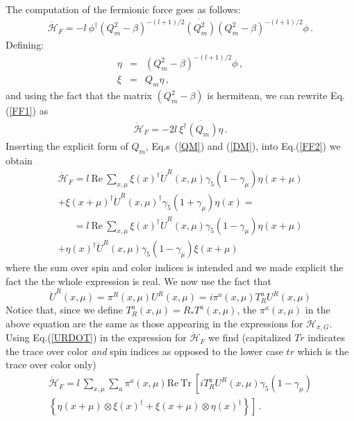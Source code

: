 \documentclass{article}[12pt]
\begin{document}
The computation of the fermionic force goes as follows:
\begin{eqnarray}
\dot{\mathcal{H}}_F = -l\ \phi^\dagger (Q_m^2 - \beta)^{-(l+1)/2} \dot{(Q_m^2)} (Q_m^2 - \beta)^{-(l+1)/2} \phi \, . \label{FF1}
\end{eqnarray}
Defining:
\begin{eqnarray}
\eta &=& (Q_m^2 - \beta)^{-(l+1)/2} \phi \, , \label{HMCETA}\\
\xi &=& Q_m \eta \, ,
\end{eqnarray}
and using the fact that the matrix $(Q_m^2-\beta)$ is hermitean, we can rewrite Eq.(\ref{FF1}) as
\begin{eqnarray}
\dot{\mathcal{H}}_F = - 2 l\ \xi^\dagger \dot{(Q_m)} \eta \, . \label{FF2}
\end{eqnarray}
Inserting the explicit form of $Q_m$, Eq.s~(\ref{QM}) and (\ref{DM}), into Eq.(\ref{FF2}) we obtain
\begin{multline}
\dot{\mathcal{H}}_F = l\ \mathrm{Re\ }\sum_{x,\mu} \xi(x)^\dagger \dot U^R(x,\mu) \gamma_5 (1-\gamma_\mu) \eta(x+\mu) \\ 
+ \xi(x+\mu)^\dagger \dot U^R(x,\mu)^\dagger \gamma_5 (1+\gamma_\mu) \eta(x) = \nonumber 
\end{multline}
\begin{multline}
\phantom{\dot{\mathcal{H}}_F} =  l\ \mathrm{Re\ }\sum_{x,\mu} \xi(x)^\dagger \dot U^R(x,\mu) \gamma_5 (1-\gamma_\mu) \eta(x+\mu) \\ 
+ \eta(x)^\dagger \dot U^R(x,\mu) \gamma_5 (1-\gamma_\mu) \xi(x+\mu)
\end{multline}
where the sum over spin and color indices is intended and we made explicit the fact the the whole 
expression is real.
We now use the fact that 
\begin{equation}
\dot U^R (x,\mu) = \pi^R(x,\mu) U^R(x,\mu) = i \pi^a(x,\mu) T^a_R U^R(x,\mu) \label{URDOT}
\end{equation}
Notice that, since we define $T^a_R(x,\mu) = R_* T^a(x,\mu)$, the $\pi^a(x,\mu)$ in the above 
equation are the same as those appearing in the expressions for $\dot{\mathcal{H}}_{\pi,G}$.
Using Eq.(\ref{URDOT}) in the expression for $\dot{\mathcal{H}}_{F}$ we find
(capitalized $Tr$ indicates the trace over color \textit{and} spin indices as opposed to the lower
 case $tr$ which is the trace over color only)
\begin{multline}
\dot{\mathcal{H}}_F = l\ \sum_{x,\mu} \sum_a \pi^a(x,\mu) \mathrm{Re\ Tr\ } \left[ iT^a_R U^R(x,\mu) \gamma_5 (1-\gamma_\mu) \right. \\
		\left. \left\{ \eta(x+\mu)\otimes\xi(x)^\dagger + \xi(x+\mu)\otimes\eta(x)^\dagger \right\} \right] \, . \label{HDOTF}
\end{multline}
\end{document}

